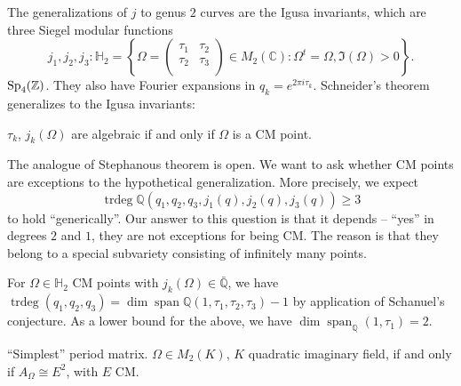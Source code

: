 \documentclass[reqno]{amsart} 
\numberwithin{theorem}{section}
\numberwithin{equation}{section}
\begin{document}
The generalizations of $j$ to genus $2$ curves are the Igusa invariants, which are three Siegel modular functions
\begin{equation*}
  j_1, j_2, j_3 : \mathbb{H}_2 = \left\{ \Omega =
    \begin{pmatrix}
      \tau_1      & \tau_2 \\
      \tau_2               & \tau_3 \\
    \end{pmatrix} \in M_2(\mathbb{C}) : \Omega^t = \Omega, \Im(\Omega) > 0 \right\}.
\end{equation*}
$\operatorname{Sp}_4(\mathbb{Z})$.  They also have Fourier expansions in $q_k = e^{2 \pi i \tau_k}$.  Schneider's theorem generalizes to the Igusa invariants:
\begin{theorem}
  $\tau_k$, $j_k(\Omega)$ are algebraic if and only if $\Omega$ is a CM point.
\end{theorem}
The analogue of Stephanous theorem is open.  We want to ask whether CM points are exceptions to the hypothetical generalization.  More precisely,  we expect
\begin{equation*}
  \operatorname{trdeg} \mathbb{Q}(q_1, q_2, q_3, j_1(q), j_2(q), j_3(q)) \geq 3
\end{equation*}
to hold ``generically''.  Our answer to this question is that it depends -- ``yes'' in degrees $2$ and $1$, they are not exceptions for being CM.  The reason is that they belong to a special subvariety consisting of infinitely many points.

For $\Omega \in \mathbb{H}_2$ CM points with $j_k(\Omega) \in \bar{\mathbb{Q}}$, we have $\operatorname{trdeg}(q_1, q_2, q_3) = \dim \operatorname{span} \mathbb{Q}(1, \tau_1, \tau_2, \tau_3) - 1$ by application of Schanuel's conjecture.  As a lower bound for the above, we have $\dim \operatorname{span}_{\mathbb{Q}}(1, \tau_1) = 2$.

\begin{lemma}
  ``Simplest'' period matrix.  $\Omega \in M_2(K)$, $K$ quadratic imaginary field, if and only if $A_{\Omega} \cong E^2$, with $E$ CM.
\end{lemma}
\end{document}
